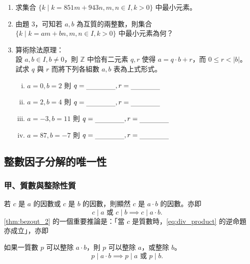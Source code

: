 \begin{enumerate}[1.]
  \item 求集合 $\{k \mid k = 851m + 943n, m, n \in I, k > 0\}$ 中最小元素。

  \item 由題 3，可知若 $a, b$ 為互質的兩整數，則集合 $\{k \mid k = am + bn, m, n \in I, k > 0\}$ 中最小元素為何？

  \item 算術除法原理：\\
  設 $a, b \in I, b \neq 0$，則 $\mathbb{Z}$ 中恰有二元素 $q, r$ 使得 $a = q \cdot b + r$，而 $0 \le r < |b|$。\\
  試求 $q$ 與 $r$ 而將下列各組數 $a, b$ 表為上式形式。
  \begin{enumerate}[(i)]
    \item $a=0, b=2$ 則 $q = \blank, r = \blank$
    \item $a=2, b=4$ 則 $q = \blank, r = \blank$
    \item $a=-3, b=11$ 則 $q = \blank, r = \blank$
    \item $a=87, b=-7$ 則 $q = \blank, r = \blank$
  \end{enumerate}
\end{enumerate}

\subsection{整數因子分解的唯一性}\label{sec:6-3}

\subsubsection*{甲、質數與整除性質}\label{subsec:6-3-a}

若 $c$ 是 $a$ 的因數或 $c$ 是 $b$ 的因數，則顯然 $c$ 是 $a \cdot b$ 的因數。亦即
\begin{equation}
  c \mid a \text{ 或 } c \mid b \implies c \mid a \cdot b. \label{eq:div_product}
\end{equation}
\cref{thm:bezout_2} 的一個重要推論是：「當 $c$ 是質數時，\eqref{eq:div_product} 的逆命題亦成立」，亦即

\begin{corollary}\label{cor:prime_div_prod}
如果一質數 $p$ 可以整除 $a \cdot b$，則 $p$ 可以整除 $a$，或整除 $b$。
\begin{equation}
  p \mid a \cdot b \implies p \mid a \text{ 或 } p \mid b. \label{eq:euclid_lemma}
\end{equation}
\end{corollary}

